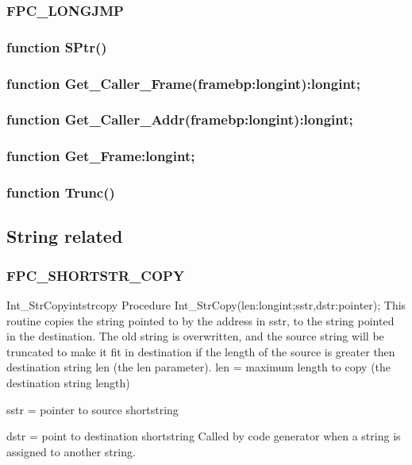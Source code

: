 \documentclass [a4paper,12pt]{article}
\begin{document}
\subsubsection{FPC{\_}LONGJMP}
\label{subsubsec:mylabel31}

\subsubsection{function SPtr()}
\label{subsubsec:function}

\subsubsection{function Get{\_}Caller{\_}Frame(framebp:longint):longint;}
\label{subsubsec:mylabel32}

\subsubsection{function Get{\_}Caller{\_}Addr(framebp:longint):longint;}
\label{subsubsec:mylabel33}

\subsubsection{function Get{\_}Frame:longint;}
\label{subsubsec:mylabel34}

\subsubsection{function Trunc()}
\label{subsubsec:mylabel35}

\subsection{String related}
\label{subsec:string}

\subsubsection{FPC{\_}SHORTSTR{\_}COPY}
\label{subsubsec:mylabel36}

\begin{procedurel}{Int{\_}StrCopy}{intstrcopy}
\Declaration
Procedure Int{\_}StrCopy(len:longint;sstr,dstr:pointer);
\Description
This routine copies the string pointed to by the address in sstr, to the
string pointed in the destination. The old string is overwritten, and the
source string will be truncated to make it fit in destination if the length
of the source is greater then destination string len (the len parameter).
\Parameters
len = maximum length to copy (the destination string length) \par
sstr = pointer to source shortstring \par
dstr = point to destination shortstring
\Notes
Called by code generator when a string is assigned to another string.
\end{procedurel}
\end{document}
